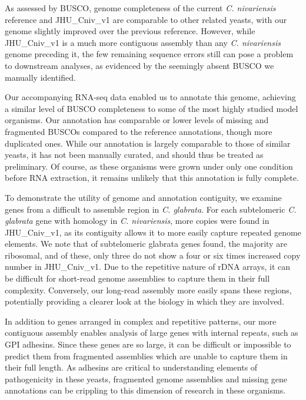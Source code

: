 As assessed by BUSCO, genome completeness of the current \textit{C. nivariensis} reference and JHU\_Cniv\_v1 are comparable to other related yeasts, with our genome slightly improved over the previous reference. However, while JHU\_Cniv\_v1 is a much more contiguous assembly than any \textit{C. nivariensis} genome preceding it, the few remaining sequence errors still can pose a problem to downstream analyses, as evidenced by the seemingly absent BUSCO we manually identified.

Our accompanying RNA-seq data enabled us to annotate this genome, achieving a similar level of BUSCO completeness to some of the most highly studied model organisms. Our annotation has comparable or lower levels of missing and fragmented BUSCOs compared to the reference annotations, though more duplicated ones. While our annotation is largely comparable to those of similar yeasts, it has not been manually curated, and should thus be treated as preliminary. Of course, as these organisms were grown under only one condition before RNA extraction, it remains unlikely that this annotation is fully complete.

To demonstrate the utility of genome and annotation contiguity, we examine genes from a difficult to assemble region in \textit{C. glabrata}. For each subtelomeric \textit{C. glabrata} gene with homology in \textit{C. nivariensis}, more copies were found in JHU\_Cniv\_v1, as its contiguity allows it to more easily capture repeated genome elements. We note that of subtelomeric glabrata genes found, the majority are ribosomal, and of these, only three do not show a four or six times increased copy number in JHU\_Cniv\_v1. Due to the repetitive nature of rDNA arrays, it can be difficult for short-read genome assemblies to capture them in their full complexity. Conversely, our long-read assembly more easily spans these regions, potentially providing a clearer look at the biology in which they are involved.

In addition to genes arranged in complex and repetitive patterns, our more contiguous assembly enables analysis of large genes with internal repeats, such as GPI adhesins. Since these genes are so large, it can be difficult or impossible to predict them from fragmented assemblies which are unable to capture them in their full length. As adhesins are critical to understanding elements of pathogenicity in these yeasts, fragmented genome assemblies and missing gene annotations can be crippling to this dimension of research in these organisms.


